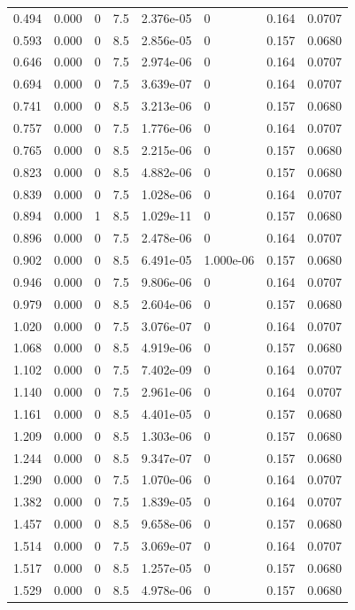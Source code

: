 \documentclass[preview]{standalone}
\begin{document}
{{\begin{tabular}{L{1.2cm}C{1.2cm} C{0.3cm}C{0.5cm} C{1.4cm}C{1.4cm} C{1.4cm}C{1.4cm}}
  0.494  &  0.000  & 0     & 7.5 &  2.376e-05  & 0  & 0.164 &  0.0707   \\ 
  0.593  &  0.000  & 0     & 8.5 &  2.856e-05  & 0  & 0.157 &  0.0680   \\ 
  0.646  &  0.000  & 0     & 7.5 &  2.974e-06  & 0  & 0.164 &  0.0707   \\ 
  0.694  &  0.000  & 0     & 7.5 &  3.639e-07  & 0  & 0.164 &  0.0707   \\ 
  0.741  &  0.000  & 0     & 8.5 &  3.213e-06  & 0  & 0.157 &  0.0680   \\ 
  0.757  &  0.000  & 0     & 7.5 &  1.776e-06  & 0  & 0.164 &  0.0707   \\ 
  0.765  &  0.000  & 0     & 8.5 &  2.215e-06  & 0  & 0.157 &  0.0680   \\ 
  0.823  &  0.000  & 0     & 8.5 &  4.882e-06  & 0  & 0.157 &  0.0680   \\ 
  0.839  &  0.000  & 0     & 7.5 &  1.028e-06  & 0  & 0.164 &  0.0707   \\ 
  0.894  &  0.000  & 1     & 8.5 &  1.029e-11  & 0  & 0.157 &  0.0680   \\ 
  0.896  &  0.000  & 0     & 7.5 &  2.478e-06  & 0  & 0.164 &  0.0707   \\ 
  0.902  &  0.000  & 0     & 8.5 &  6.491e-05  & 1.000e-06  & 0.157 &  0.0680   \\ 
  0.946  &  0.000  & 0     & 7.5 &  9.806e-06  & 0  & 0.164 &  0.0707   \\ 
  0.979  &  0.000  & 0     & 8.5 &  2.604e-06  & 0  & 0.157 &  0.0680   \\ 
  1.020  &  0.000  & 0     & 7.5 &  3.076e-07  & 0  & 0.164 &  0.0707   \\ 
  1.068  &  0.000  & 0     & 8.5 &  4.919e-06  & 0  & 0.157 &  0.0680   \\ 
  1.102  &  0.000  & 0     & 7.5 &  7.402e-09  & 0  & 0.164 &  0.0707   \\ 
  1.140  &  0.000  & 0     & 7.5 &  2.961e-06  & 0  & 0.164 &  0.0707   \\ 
  1.161  &  0.000  & 0     & 8.5 &  4.401e-05  & 0  & 0.157 &  0.0680   \\ 
  1.209  &  0.000  & 0     & 8.5 &  1.303e-06  & 0  & 0.157 &  0.0680   \\ 
  1.244  &  0.000  & 0     & 8.5 &  9.347e-07  & 0  & 0.157 &  0.0680   \\ 
  1.290  &  0.000  & 0     & 7.5 &  1.070e-06  & 0  & 0.164 &  0.0707   \\ 
  1.382  &  0.000  & 0     & 7.5 &  1.839e-05  & 0  & 0.164 &  0.0707   \\ 
  1.457  &  0.000  & 0     & 8.5 &  9.658e-06  & 0  & 0.157 &  0.0680   \\ 
  1.514  &  0.000  & 0     & 7.5 &  3.069e-07  & 0  & 0.164 &  0.0707   \\ 
  1.517  &  0.000  & 0     & 8.5 &  1.257e-05  & 0  & 0.157 &  0.0680   \\ 
  1.529  &  0.000  & 0     & 8.5 &  4.978e-06  & 0  & 0.157 &  0.0680   \\ 
\hline 
\end{tabular} 

}}
\end{document}
